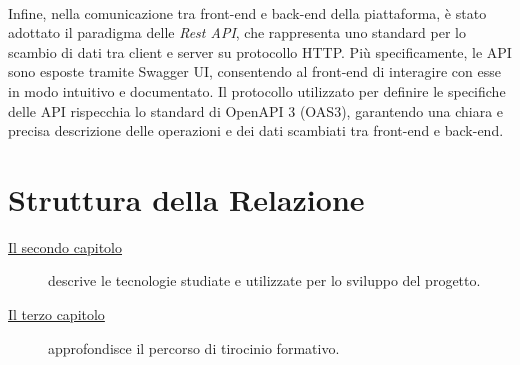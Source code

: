 \\Infine, nella comunicazione tra front-end e back-end della piattaforma, è stato adottato il paradigma delle \textit{Rest API}, che rappresenta uno standard per lo scambio di dati tra client e server su protocollo HTTP. Più specificamente, le API sono esposte tramite Swagger UI, consentendo al front-end di interagire con esse in modo intuitivo e documentato. Il protocollo utilizzato per definire le specifiche delle API rispecchia lo standard di OpenAPI 3 (OAS3), garantendo una chiara e precisa descrizione delle operazioni e dei dati scambiati tra front-end e back-end.

\section{Struttura della Relazione}

\begin{description}
    \item[{\hyperref[cap:chapter2]{Il secondo capitolo}}] descrive le tecnologie studiate e utilizzate per lo sviluppo del progetto.
    \item[{\hyperref[cap:chapter2]{Il terzo capitolo}}] approfondisce il percorso di tirocinio formativo.
\end{description}